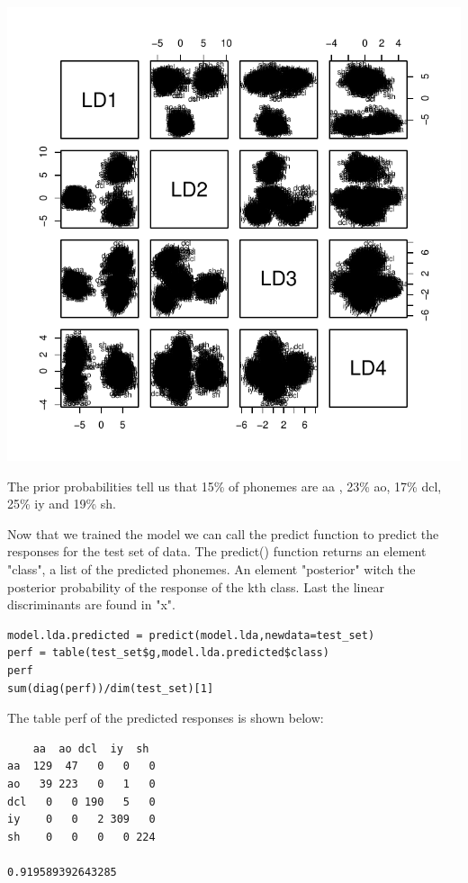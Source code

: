 \documentclass[]{report}
\begin{document}
\begin{center}
	\includegraphics{Figures/model_lda_plot.pdf}
\end{center}

The prior probabilities tell us that 15\% of phonemes are aa , 23\% ao, 17\% dcl, 25\% iy and 19\% sh.

Now that we trained the model we can call the predict function to predict the responses for the test set of data. The predict() function returns an element "class", a list of the predicted phonemes. An element "posterior" witch the posterior probability of the response of the kth class.  Last the linear discriminants are found in "x".


\begin{lstlisting}
model.lda.predicted = predict(model.lda,newdata=test_set)
perf = table(test_set$g,model.lda.predicted$class)
perf
sum(diag(perf))/dim(test_set)[1]
\end{lstlisting}

The table perf of the predicted responses is shown below:
\begin{center}
\begin{verbatim}
	aa  ao dcl  iy  sh
aa  129  47   0   0   0
ao   39 223   0   1   0
dcl   0   0 190   5   0
iy    0   0   2 309   0
sh    0   0   0   0 224

0.919589392643285
\end{verbatim}
\end{center}
\end{document}
